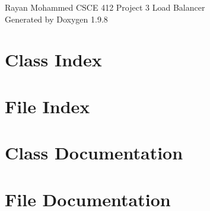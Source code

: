 \documentclass[twoside]{book}
\newcommand{\+}{\discretionary{\mbox{\scriptsize$\hookleftarrow$}}{}{}}
\newcommand{\clearemptydoublepage}{%
    \newpage{\pagestyle{empty}\cleardoublepage}%
  }
\begin{document}
  \raggedbottom
    \hypersetup{pageanchor=false,
                bookmarksnumbered=true,
                pdfencoding=unicode
               }
  \begin{titlepage}
  \vspace*{7cm}
  \begin{center}%
  {\Large Rayan Mohammed CSCE 412 Project 3 Load Balancer}\\
  \vspace*{1cm}
  {\large Generated by Doxygen 1.9.8}\\
  \end{center}
  \end{titlepage}
  \clearemptydoublepage
  \tableofcontents
  \clearemptydoublepage
  \hypersetup{pageanchor=true}

\chapter{Class Index}

\chapter{File Index}

\chapter{Class Documentation}



\chapter{File Documentation}












  \backmatter
  \newpage
  \clearemptydoublepage
  \printindex
\end{document}
